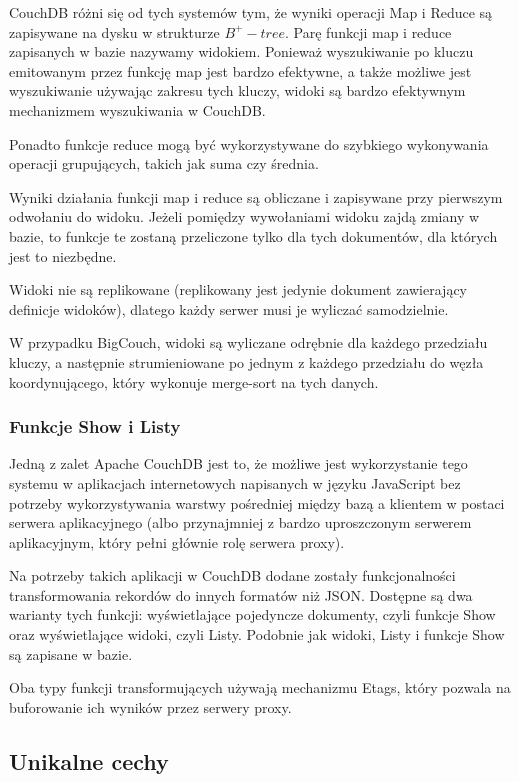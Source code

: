CouchDB różni się od tych systemów tym, że wyniki operacji Map i Reduce są zapisywane na dysku w strukturze $B^+-tree$.
Parę funkcji map i reduce zapisanych w bazie nazywamy widokiem.
Ponieważ wyszukiwanie po kluczu emitowanym przez funkcję map jest bardzo efektywne, a także możliwe jest wyszukiwanie używając zakresu tych kluczy, widoki są bardzo efektywnym mechanizmem wyszukiwania w CouchDB.

Ponadto funkcje reduce mogą być wykorzystywane do szybkiego wykonywania operacji grupujących, takich jak suma czy średnia.

Wyniki działania funkcji map i reduce są obliczane i zapisywane przy pierwszym odwołaniu do widoku.
Jeżeli pomiędzy wywołaniami widoku zajdą zmiany w bazie, to funkcje te zostaną przeliczone tylko dla tych dokumentów, dla których jest to niezbędne.

Widoki nie są replikowane (replikowany jest jedynie dokument zawierający definicje widoków), dlatego każdy serwer musi je wyliczać samodzielnie.

W przypadku BigCouch, widoki są wyliczane odrębnie dla każdego przedziału kluczy, a następnie strumieniowane po jednym z każdego przedziału do węzła koordynującego, który wykonuje merge-sort na tych danych.

\subsubsection*{Funkcje Show i Listy}

Jedną z zalet Apache CouchDB jest to, że możliwe jest wykorzystanie tego systemu w aplikacjach internetowych napisanych w języku JavaScript bez potrzeby wykorzystywania warstwy pośredniej między bazą a klientem w postaci serwera aplikacyjnego (albo przynajmniej z bardzo uproszczonym serwerem aplikacyjnym, który pełni głównie rolę serwera proxy).

Na potrzeby takich aplikacji w CouchDB dodane zostały funkcjonalności transformowania rekordów do innych formatów niż JSON.
Dostępne są dwa warianty tych funkcji: wyświetlające pojedyncze dokumenty, czyli funkcje Show oraz wyświetlające widoki, czyli Listy.
Podobnie jak widoki, Listy i funkcje Show są zapisane w bazie.

Oba typy funkcji transformujących używają mechanizmu Etags, który pozwala na buforowanie ich wyników przez serwery proxy.

\subsection*{Unikalne cechy}


